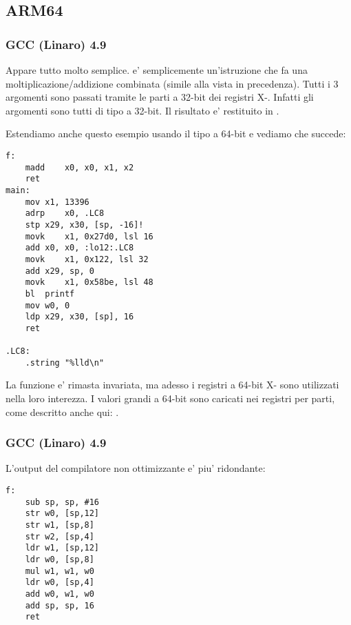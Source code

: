 \subsection{ARM64}

\subsubsection{\Optimizing GCC (Linaro) 4.9}

Appare tutto molto semplice.
 e' semplicemente un'istruzione che fa una moltiplicazione/addizione combinata (simile alla  vista in precedenza).
Tutti i 3 argomenti sono passati tramite le parti a 32-bit dei registri X-.
Infatti gli argomenti sono tutti di tipo  a 32-bit.
Il risultato e' restituito in .



Estendiamo anche questo esempio usando il tipo  a 64-bit e vediamo che succede:



\begin{lstlisting}
f:
	madd	x0, x0, x1, x2
	ret
main:
	mov	x1, 13396
	adrp	x0, .LC8
	stp	x29, x30, [sp, -16]!
	movk	x1, 0x27d0, lsl 16
	add	x0, x0, :lo12:.LC8
	movk	x1, 0x122, lsl 32
	add	x29, sp, 0
	movk	x1, 0x58be, lsl 48
	bl	printf
	mov	w0, 0
	ldp	x29, x30, [sp], 16
	ret

.LC8:
	.string	"%lld\n"
\end{lstlisting}

La funzione \ttf{} e' rimasta invariata, ma adesso i registri a 64-bit X- sono utilizzati nella loro interezza.
I valori grandi a 64-bit sono caricati nei registri per parti, come descritto anche qui: .

\subsubsection{\NonOptimizing GCC (Linaro) 4.9}

L'output del compilatore non ottimizzante e' piu' ridondante:

\begin{lstlisting}
f:
	sub	sp, sp, #16
	str	w0, [sp,12]
	str	w1, [sp,8]
	str	w2, [sp,4]
	ldr	w1, [sp,12]
	ldr	w0, [sp,8]
	mul	w1, w1, w0
	ldr	w0, [sp,4]
	add	w0, w1, w0
	add	sp, sp, 16
	ret
\end{lstlisting}

